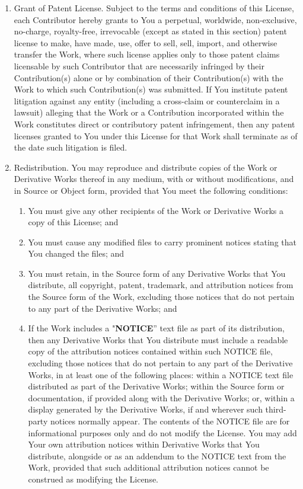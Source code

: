 \begin{enumerate}
\item Grant of Patent License. Subject to the terms and conditions of this License, each Contributor hereby grants to You a perpetual, worldwide, non-exclusive, no-charge, royalty-free, irrevocable (except as stated in this section) patent license to make, have made, use, offer to sell, sell, import, and otherwise transfer the Work, where such license applies only to those patent claims licensable by such Contributor that are necessarily infringed by their Contribution(s) alone or by combination of their Contribution(s) with the Work to which such Contribution(s) was submitted. If You institute patent litigation against any entity (including a cross-claim or counterclaim in a lawsuit) alleging that the Work or a Contribution incorporated within the Work constitutes direct or contributory patent infringement, then any patent licenses granted to You under this License for that Work shall terminate as of the date such litigation is filed.\\
\item Redistribution. You may reproduce and distribute copies of the Work or Derivative Works thereof in any medium, with or without modifications, and in Source or Object form, provided that You meet the following conditions:
\begin{enumerate}
\item You must give any other recipients of the Work or Derivative Works a copy of this License; and\\
\item You must cause any modified files to carry prominent notices stating that You changed the files; and\\
\item You must retain, in the Source form of any Derivative Works that You distribute, all copyright, patent, trademark, and attribution notices from the Source form of the Work, excluding those notices that do not pertain to any part of the Derivative Works; and\\
\item If the Work includes a "\textbf{NOTICE}'' text file as part of its distribution, then any Derivative Works that You distribute must include a readable copy of the attribution notices contained within such NOTICE file, excluding those notices that do not pertain to any part of the Derivative Works, in at least one of the following places: within a 		         NOTICE text file distributed as part of the Derivative Works; within the Source form or documentation, if provided along with the Derivative Works; or, within a display generated by the Derivative Works, if and wherever such third-party notices normally appear. The contents of the NOTICE file are for informational purposes only and do not 	         modify the License. You may add Your own attribution notices within Derivative Works that You distribute, alongside or as an addendum to the NOTICE text from the Work, provided that such additional attribution notices cannot be construed as modifying the License. \\


\end{enumerate}
\end{enumerate}
